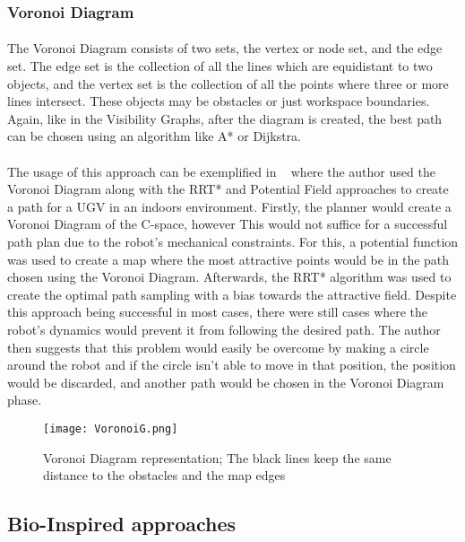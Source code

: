 \subsubsection{Voronoi Diagram}
\label{subsubsec:VD}
\paragraph{}The Voronoi Diagram consists of two sets, the vertex or node set, and the edge set. The edge set is the collection of all the lines 
which are equidistant to two objects, and the vertex set is the collection of all the points where three or more lines intersect. These objects
may be obstacles or just workspace boundaries. Again, like in the Visibility Graphs, after the diagram is created, the best path can be chosen using
an algorithm like A* or Dijkstra.

\paragraph{}The usage of this approach can be exemplified in ~\cite{8948325} where the author used the Voronoi Diagram along with the RRT* and Potential Field
approaches to create a path for a \gls{UGV} in an indoors environment. Firstly, the planner would create a Voronoi Diagram of the C-space, however This
would not suffice for a successful path plan due to the robot's mechanical constraints. For this, a potential function was used to create a map
where the most attractive points would be in the path chosen using the Voronoi Diagram. Afterwards, the RRT* algorithm was used to create the
optimal path sampling with a bias towards the attractive field. Despite this approach being successful in most cases, there were still cases where
the robot's dynamics would prevent it from following the desired path. The author then suggests that this problem would easily be overcome by
making a circle around the robot and if the circle isn't able to move in that position, the position would be discarded, and another path would be chosen
in the Voronoi Diagram phase.
\begin{figure}
    \centering
    \texttt{[image: VoronoiG.png]}
    \caption{Voronoi Diagram representation; The black lines keep the same distance to the obstacles and the map edges}
    \label{fig:VoronoiG}
\end{figure}

\subsection{Bio-Inspired approaches}
\label{subsec:BI}
